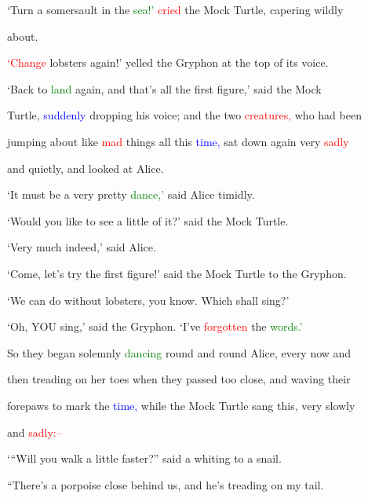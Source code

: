  ‘Turn a somersault in the \textcolor{green}{sea!’} \textcolor{red}{cried} the Mock Turtle, capering wildly

 about.



 \textcolor{red}{‘Change} lobsters again!’ \textcolor{BurntOrange}{yelled} the Gryphon at the \textcolor{BurntOrange}{top} of its voice.



 ‘Back to \textcolor{green}{land} again, and that’s all the first figure,’ said the Mock

 Turtle, \textcolor{blue}{suddenly} dropping his voice; and the two \textcolor{red}{creatures,} who had been

 jumping about like \textcolor{red}{mad} things all this \textcolor{blue}{time,} sat down again very \textcolor{red}{sadly}

 and quietly, and looked at Alice.



 ‘It must be a very \textcolor{BurntOrange}{pretty} \textcolor{green}{dance,’} said Alice timidly.



 ‘Would you like to see a little of it?’ said the Mock Turtle.



 ‘Very much indeed,’ said Alice.



 ‘Come, let’s try the first figure!’ said the Mock Turtle to the Gryphon.

 ‘We can do without lobsters, you know. Which shall \textcolor{BurntOrange}{sing?’}



 ‘Oh, YOU \textcolor{BurntOrange}{sing,’} said the Gryphon. ‘I’ve \textcolor{red}{forgotten} the \textcolor{green}{words.’}



 So they began solemnly \textcolor{green}{dancing} round and round Alice, every now and

 then treading on her toes when they passed too close, and waving their

 forepaws to mark the \textcolor{blue}{time,} while the Mock Turtle sang this, very slowly

 and \textcolor{red}{sadly:--}



 ‘“Will you walk a little faster?” said a \textcolor{BurntOrange}{whiting} to a snail.

 “There’s a porpoise close behind us, and he’s treading on my tail.



